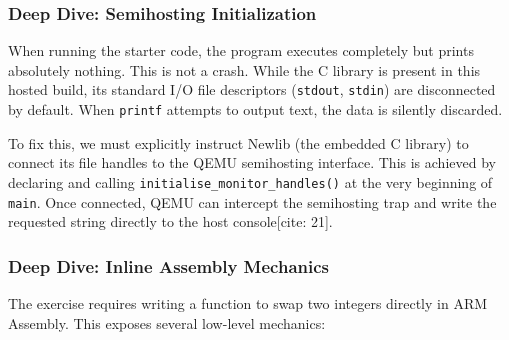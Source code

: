 \subsubsection{Deep Dive: Semihosting Initialization}
When running the starter code, the program executes completely but prints absolutely nothing. This is not a crash. While the C library is present in this hosted build, its standard I/O file descriptors (\texttt{stdout}, \texttt{stdin}) are disconnected by default. When \texttt{printf} attempts to output text, the data is silently discarded.

To fix this, we must explicitly instruct Newlib (the embedded C library) to connect its file handles to the QEMU semihosting interface. This is achieved by declaring and calling \texttt{initialise\_monitor\_handles()} at the very beginning of \texttt{main}. Once connected, QEMU can intercept the semihosting trap and write the requested string directly to the host console[cite: 21].

\subsubsection{Deep Dive: Inline Assembly Mechanics}
The exercise requires writing a function to swap two integers directly in ARM Assembly. This exposes several low-level mechanics:

